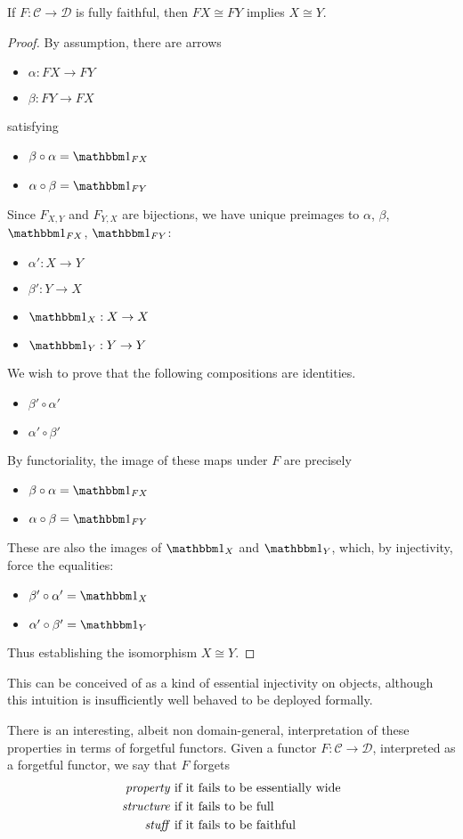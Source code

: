 \begin{prop}
If $F:\mathcal{C}\to\mathcal{D}$ is fully faithful, then $FX\cong FY$ implies $X\cong Y$.
\end{prop}

\begin{proof}
By assumption, there are arrows
\begin{itemize}
    \item $\alpha : FX\to FY$
    \item $\beta : FY\to FX$
\end{itemize}
satisfying 
\begin{itemize}
    \item $\beta\circ\alpha = \Id{FX}$
    \item $\alpha\circ\beta = \Id{FY}$
\end{itemize}
Since $F_{X,Y}$ and $F_{Y,X}$ are bijections, we have unique preimages to $\alpha$, $\beta$, $\Id{FX}$, $\Id{FY}$:
\begin{itemize}
    \item $\alpha' : X \to Y$
    \item $\beta ' : Y \to X$
    \item $\Id{X}  : X \to X$
    \item $\Id{Y}  : Y \to Y$
\end{itemize}
We wish to prove that the following compositions are identities.
\begin{itemize}
    \item $\beta'\circ\alpha'$
    \item $\alpha'\circ\beta'$
\end{itemize}
By functoriality, the image of these maps under $F$ are precisely
\begin{itemize}
    \item $\beta\circ\alpha = \Id{FX}$
    \item $\alpha \circ \beta = \Id{FY}$
\end{itemize}
These are also the images of $\Id{X}$ and $\Id{Y}$, which, by injectivity, force the equalities:
\begin{itemize}
    \item $\beta'\circ\alpha' = \Id{X}$
    \item $\alpha'\circ\beta' = \Id{Y}$
\end{itemize}
Thus establishing the isomorphism $X\cong Y$.
\end{proof}

This can be conceived of as a kind of essential injectivity on objects, although this intuition is insufficiently well behaved to be deployed formally.

There is an interesting, albeit non domain-general, interpretation of these properties in terms of forgetful functors. Given a functor $F:\mathcal{C}\to\mathcal{D}$, interpreted as a forgetful functor, we say that $F$ forgets
\begin{align*}
    \text{\emph{property} if} & \text{ it fails to be essentially wide} \\
    \text{\emph{structure} if} & \text{ it fails to be full} \\
    \text{\emph{stuff} if} & \text{ it fails to be faithful}
\end{align*}
